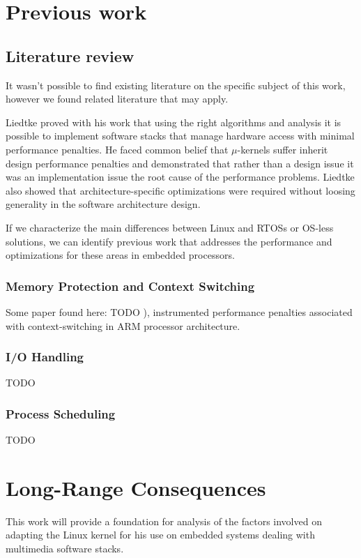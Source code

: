 \section{Previous work}
\subsection{Literature review}
It wasn't possible to find existing literature on the specific subject of this work, however we found related literature that may apply.

Liedtke \cite{Liedtke:1995kx} proved with his work that using the right algorithms and analysis it is possible to implement software stacks that manage hardware access with minimal performance penalties. He faced common belief that $\mu$-kernels suffer inherit design performance penalties and demonstrated that rather than a design issue it was an implementation issue the root cause of the performance problems. Liedtke also showed that architecture-specific optimizations were required without loosing generality in the software architecture design.

If we characterize the main differences between Linux and \acp{RTOS} or \ac{OS}-less solutions, we can identify previous work that addresses the performance and optimizations for these areas in embedded processors.

\subsubsection{Memory Protection and Context Switching}

Some paper found here: TODO \cite{Chanteperdrix:2009fk}), instrumented performance penalties associated with context-switching in ARM processor architecture.

\subsubsection{I/O Handling}
TODO

\subsubsection{Process Scheduling}
TODO

\section{Long-Range Consequences}
This work will provide a foundation for analysis of the factors involved on adapting the Linux kernel for his use on embedded systems dealing with multimedia software stacks.
